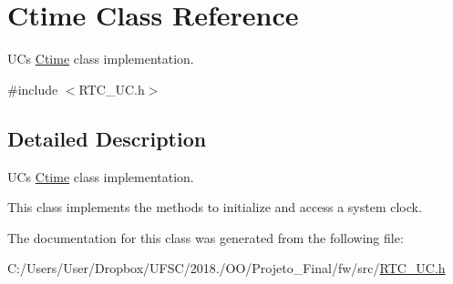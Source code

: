 \hypertarget{class_ctime}{}\section{Ctime Class Reference}
\label{class_ctime}


UC\textquotesingle{}s \mbox{\hyperlink{class_ctime}{Ctime}} class implementation.  




{\ttfamily \#include $<$R\+T\+C\+\_\+\+U\+C.\+h$>$}



\subsection{Detailed Description}
UC\textquotesingle{}s \mbox{\hyperlink{class_ctime}{Ctime}} class implementation. 

This class implements the methods to initialize and access a system clock. 

The documentation for this class was generated from the following file\+:\begin{DoxyCompactItemize}
\item 
C\+:/\+Users/\+User/\+Dropbox/\+U\+F\+S\+C/2018./\+O\+O/\+Projeto\+\_\+\+Final/fw/src/\mbox{\hyperlink{_r_t_c___u_c_8h}{R\+T\+C\+\_\+\+U\+C.\+h}}\end{DoxyCompactItemize}
